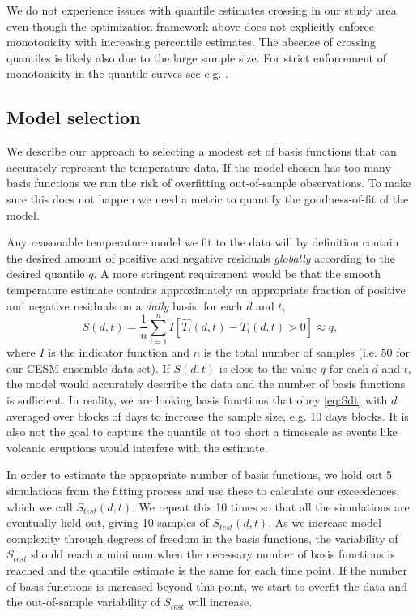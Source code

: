 \documentclass{ametsoc}
\begin{document}
We do not experience issues with quantile estimates crossing in our study area even though the optimization framework above does not explicitly enforce monotonicity with increasing percentile estimates. The absence of crossing quantiles is likely also due to the large sample size. For strict enforcement of monotonicity in the quantile curves see e.g. \citet{bondell2010noncrossing}.

\subsection{Model selection}
 We describe our approach to selecting a modest set of basis functions that can accurately represent the temperature data. If the model chosen has too many basis functions we run the risk of overfitting out-of-sample observations. To make sure this does not happen we need a metric to quantify the goodness-of-fit of the model. 

 Any reasonable temperature model we fit to the data will by definition contain the desired amount of positive and negative residuals \emph{globally} according to the desired quantile $q$. A more stringent requirement would be that the smooth temperature estimate contains approximately an appropriate fraction of positive and negative residuals on a \emph{daily} basis: for each $d$ and $t$, 
\begin{equation}
S(d,t) = \frac{1}{n}\sum_{i=1}^n I\left[\hat{T_i}(d,t) - T_i(d,t) > 0\right] \approx q, 
\label{eq:Sdt}	
\end{equation}
 where $I$ is the indicator function and $n$ is the total number of samples (i.e. 50 for our CESM ensemble data set). If $S(d,t)$ is close to the value $q$ for each $d$ and $t$, the model would accurately describe the data and the number of basis functions is sufficient. In reality, we are looking basis functions that obey \ref{eq:Sdt} with $d$ averaged over blocks of days to increase the sample size, e.g. 10 days blocks. It is also not the goal to capture the quantile at too short a timescale as events like volcanic eruptions would interfere with the estimate.

 In order to estimate the appropriate number of basis functions, we hold out 5 simulations from the fitting process and use these to calculate our exceedences, which we call $S_{test}(d,t)$. We repeat this 10 times so that all the simulations are eventually held out, giving 10 samples of $S_{test}(d,t)$. As we increase model complexity through degrees of freedom in the basis functions, the variability of $S_{test}$ should reach a minimum when the necessary number of basis functions is reached and the quantile estimate is the same for each time point. If the number of basis functions is increased beyond this point, we start to overfit the data and the out-of-sample variability of $S_{test}$ will increase. 
\end{document}
